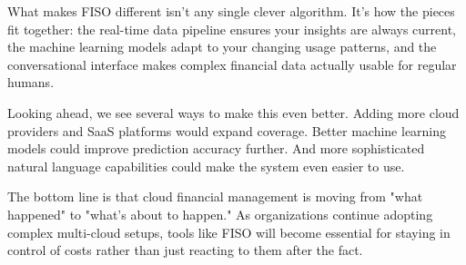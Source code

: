 \documentclass[conference]{IEEEtran}
\begin{document}
What makes FISO different isn't any single clever algorithm. It's how the pieces fit together: the real-time data pipeline ensures your insights are always current, the machine learning models adapt to your changing usage patterns, and the conversational interface makes complex financial data actually usable for regular humans.

Looking ahead, we see several ways to make this even better. Adding more cloud providers and SaaS platforms would expand coverage. Better machine learning models could improve prediction accuracy further. And more sophisticated natural language capabilities could make the system even easier to use.

The bottom line is that cloud financial management is moving from "what happened" to "what's about to happen." As organizations continue adopting complex multi-cloud setups, tools like FISO will become essential for staying in control of costs rather than just reacting to them after the fact.



\end{document}
